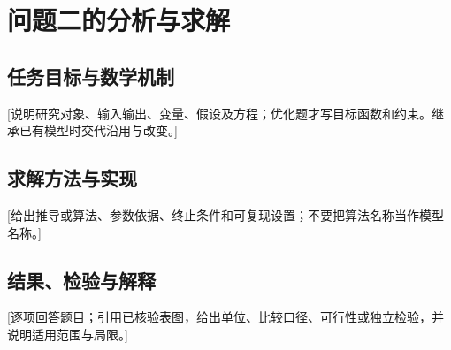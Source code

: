 \section{问题二的分析与求解}
\subsection{任务目标与数学机制}
[说明研究对象、输入输出、变量、假设及方程；优化题才写目标函数和约束。继承已有模型时交代沿用与改变。]
\subsection{求解方法与实现}
[给出推导或算法、参数依据、终止条件和可复现设置；不要把算法名称当作模型名称。]
\subsection{结果、检验与解释}
[逐项回答题目；引用已核验表图，给出单位、比较口径、可行性或独立检验，并说明适用范围与局限。]
